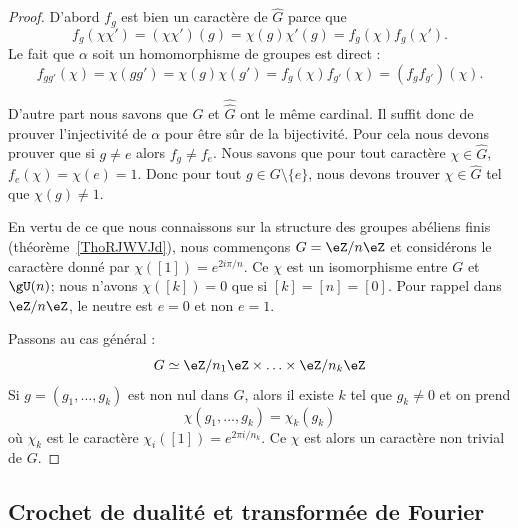 \begin{proof}

	D'abord \( f_g\) est bien un caractère de \( \hat G\) parce que
	\begin{equation}
		f_g(\chi\chi')=(\chi\chi')(g)=\chi(g)\chi'(g)=f_g(\chi)f_g(\chi').
	\end{equation}
	Le fait que \( \alpha\) soit un homomorphisme de groupes est direct :
	\begin{equation}
		f_{gg'}(\chi)=\chi(gg')=\chi(g)\chi(g')=f_g(\chi)f_{g'}(\chi)=(f_gf_{g'})(\chi).
	\end{equation}

	D'autre part nous savons que \( G\) et \( \hat{\hat G}\) ont le même cardinal. Il suffit donc de prouver l'injectivité de \( \alpha\) pour être sûr de la bijectivité. Pour cela nous devons prouver que si \( g\neq e\) alors \( f_g\neq f_e\). Nous savons que pour tout caractère \( \chi\in \hat G\), \( f_e(\chi)=\chi(e)=1\). Donc pour tout \( g\in G\setminus\{ e \}\), nous devons trouver \( \chi\in \hat G\) tel que \( \chi(g)\neq 1\).

	En vertu de ce que nous connaissons sur la structure des groupes abéliens finis (théorème~\ref{ThoRJWVJd}), nous commençons \( G=\eZ/n\eZ\) et considérons le caractère donné par \( \chi([1])= e^{2i\pi/n}\). Ce \( \chi\) est un isomorphisme entre \( G\) et \( \gU(n)\); nous n'avons \( \chi([k])=0\) que si \( [k]=[n]=[0]\). Pour rappel dans \( \eZ/n\eZ\), le neutre est \( e=0\) et non \( e=1\).

	Passons au cas général :
	\begin{equation}
		G\simeq \eZ/n_1\eZ\times \ldots\times \eZ/n_k\eZ
	\end{equation}
	Si \( g=(g_1,\ldots, g_k)\) est non nul dans \( G\), alors il existe \( k\) tel que \( g_k\neq 0\) et on prend
	\begin{equation}
		\chi(g_1,\ldots, g_k)=\chi_k(g_k)
	\end{equation}
	où \( \chi_k\) est le caractère \( \chi_i([1])= e^{2\pi i/n_k}\). Ce \( \chi\) est alors un caractère non trivial de \( G\).

\end{proof}

\subsection{Crochet de dualité et transformée de Fourier}

